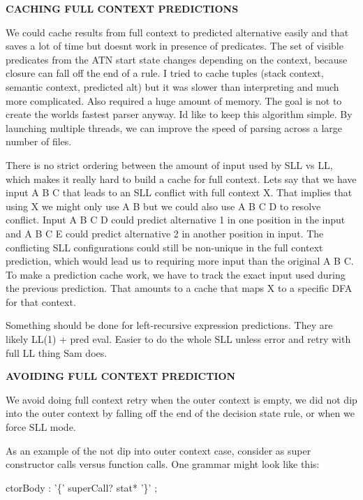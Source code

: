 {\bfseries C\+A\+C\+H\+I\+NG F\+U\+LL C\+O\+N\+T\+E\+XT P\+R\+E\+D\+I\+C\+T\+I\+O\+NS}

We could cache results from full context to predicted alternative easily and that saves a lot of time but doesn\textquotesingle{}t work in presence of predicates. The set of visible predicates from the A\+TN start state changes depending on the context, because closure can fall off the end of a rule. I tried to cache tuples (stack context, semantic context, predicted alt) but it was slower than interpreting and much more complicated. Also required a huge amount of memory. The goal is not to create the world\textquotesingle{}s fastest parser anyway. I\textquotesingle{}d like to keep this algorithm simple. By launching multiple threads, we can improve the speed of parsing across a large number of files.

There is no strict ordering between the amount of input used by S\+LL vs LL, which makes it really hard to build a cache for full context. Let\textquotesingle{}s say that we have input A B C that leads to an S\+LL conflict with full context X. That implies that using X we might only use A B but we could also use A B C D to resolve conflict. Input A B C D could predict alternative 1 in one position in the input and A B C E could predict alternative 2 in another position in input. The conflicting S\+LL configurations could still be non-\/unique in the full context prediction, which would lead us to requiring more input than the original A B C. To make a prediction cache work, we have to track the exact input used during the previous prediction. That amounts to a cache that maps X to a specific D\+FA for that context.

Something should be done for left-\/recursive expression predictions. They are likely L\+L(1) + pred eval. Easier to do the whole S\+LL unless error and retry with full LL thing Sam does.

{\bfseries A\+V\+O\+I\+D\+I\+NG F\+U\+LL C\+O\+N\+T\+E\+XT P\+R\+E\+D\+I\+C\+T\+I\+ON}

We avoid doing full context retry when the outer context is empty, we did not dip into the outer context by falling off the end of the decision state rule, or when we force S\+LL mode.

As an example of the not dip into outer context case, consider as super constructor calls versus function calls. One grammar might look like this\+:


\begin{DoxyPre}
ctorBody
  : '\{' superCall? stat* '\}'
  ;
\end{DoxyPre}


